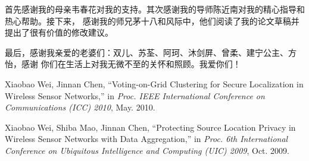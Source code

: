 \documentclass[master,winfonts]{jnuthesis}
\begin{document}
\begin{acknowledgement}
  首先感谢我的母亲韦春花对我的支持。其次感谢我的导师陈近南对我的精心指导和热心帮助。接下来，
  感谢我的师兄茅十八和风际中，他们阅读了我的论文草稿并提出了很有价值的修改建议。

  最后，感谢我亲爱的老婆们：双儿、苏荃、阿珂、沐剑屏、曾柔、建宁公主、方怡，感谢
  你们在生活上对我无微不至的关怀和照顾。我爱你们！
\end{acknowledgement}

\nocite{*}

%
%

\backmatter
\begin{resume}
\begin{publications}
\item Xiaobao Wei, Jinnan Chen, ``Voting-on-Grid Clustering for Secure
  Localization in Wireless Sensor Networks,'' in \textsl{Proc. IEEE International
    Conference on Communications (ICC) 2010}, May. 2010.
\item Xiaobao Wei, Shiba Mao, Jinnan Chen, ``Protecting Source Location Privacy
  in Wireless Sensor Networks with Data Aggregation,'' in \textsl{Proc. 6th
    International Conference on Ubiquitous Intelligence and Computing (UIC)
    2009}, Oct. 2009.
\end{publications}
\end{resume}

\end{document}
